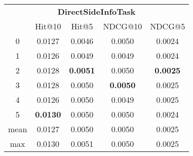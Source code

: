 \documentclass{article}
\begin{document}
 

\begin{tabular}{c|cccc}

\multicolumn{5}{c}{\textbf{DirectSideInfoTask}} \\
\noalign{\smallskip}
\noalign{\smallskip}
\toprule
\multicolumn{1}{c}{Template ID}	&	\multicolumn{1}{|c}{Hit@10}	&	\multicolumn{1}{c}{Hit@5}	&	\multicolumn{1}{c}{NDCG@10}	&	\multicolumn{1}{c}{NDCG@5}\\
\midrule
0	&	0.0127	&	0.0046	&	0.0050	&	0.0024\\
1	&	0.0126	&	0.0049	&	0.0049	&	0.0024\\
2	&	0.0128	&	\textbf{0.0051}	&	0.0050	&	\textbf{0.0025}\\
3	&	0.0128	&	0.0050	&	\textbf{0.0050}	&	0.0025\\
4	&	0.0126	&	0.0050	&	0.0049	&	0.0025\\
5	&	\textbf{0.0130}	&	0.0050	&	0.0050	&	0.0024\\
\midrule
mean	&	0.0127	&	0.0050	&	0.0050	&	0.0025\\
max	&	0.0130	&	0.0051	&	0.0050	&	0.0025\\
\bottomrule

\end{tabular}
\end{document}
